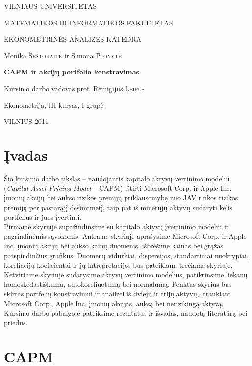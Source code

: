 \documentclass[12pt, a14paper, lithuanian]{article}
\begin{document}
\begin{titlepage}
\centerline{ \large VILNIAUS UNIVERSITETAS}
\bigskip
\centerline{\large MATEMATIKOS IR INFORMATIKOS FAKULTETAS}
\smallskip

\centerline{\large  EKONOMETRINĖS ANALIZĖS KATEDRA}
\vskip 200pt
\centerline{ \large Monika \textsc{Šeštokaitė} ir \large Simona \textsc{Plonytė}}
\vskip 50pt
\centerline{\bf \Large CAPM ir akcijų portfelio konstravimas}
\bigskip
\vskip 25pt
\centerline{Kursinio darbo vadovas prof. \large {Remigijus} \textsc{Leipus}}
\vskip 25pt
\hfill Ekonometrija, III kursas, I grupė
\vskip 100pt
\centerline{\large VILNIUS 2011}
\end{titlepage}



\tableofcontents
\newpage




\newcommand{\sectionnonum}[1]{%
    \section*{#1}%
    \addcontentsline{toc}{section}{#1}%
}
\sectionnonum{Įvadas}

Šio kursinio darbo tikslas -- naudojantis kapitalo aktyvų vertinimo modeliu (\textit{Capital Asset Pricing Model} -- CAPM) ištirti Microsoft Corp. ir Apple Inc. įmonių akcijų bei aukso rizikos premijų priklausomybę nuo JAV rinkos rizikos premijų per pastarąjį dešimtmetį, taip pat iš minėtųjų aktyvų sudaryti kelis portfelius ir juos įvertinti. \\

Pirmame skyriuje supažindinsime su kapitalo aktyvų įvertinimo modeliu ir pagrindinėmis sąvokomis. Antrame skyriuje aprašysime Microsoft Corp. ir Apple Inc. įmonių akcijų bei aukso kainų duomenis, išbrėšime kainas bei grąžas patspindinčius grafikus. Duomenų vidurkiai, dispersijos, standartiniai nuokrypiai, koreliacijų koeficientai ir jų intrepretacijos bus pateikiami trečiame skyriuje. Ketvirtame skyriuje sudarysime aktyvų vertinimo modelius, patikrinsime liekanų homoskedastiškumą, autokoreliuotumą bei normalumą. Penktas skyrius bus skirtas portfelių konstravimui ir analizei iš dviejų ir trijų aktyvų, įtraukiant Microsoft Corp., Apple Inc. įmonių akcijas, auksą bei nerizikingą aktyvą. Kursinio darbo pabaigoje pateiksime rezultatus ir išvadas, naudotą literatūrą bei priedus.

\newpage

\section{CAPM}
\end{document}
